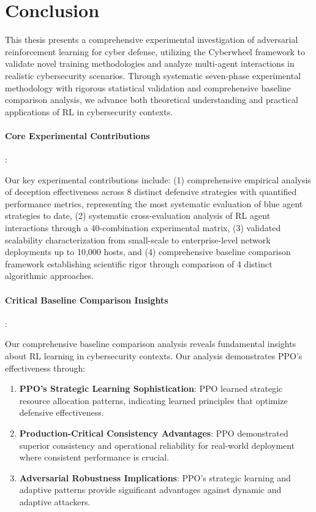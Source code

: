\documentclass[12pt,oneside]{article}
\begin{document}
\clearpage
\section{Conclusion}

This thesis presents a comprehensive experimental investigation of adversarial reinforcement learning for cyber defense, utilizing the Cyberwheel framework to validate novel training methodologies and analyze multi-agent interactions in realistic cybersecurity scenarios. Through systematic seven-phase experimental methodology with rigorous statistical validation and comprehensive baseline comparison analysis, we advance both theoretical understanding and practical applications of RL in cybersecurity contexts.

\paragraph{Core Experimental Contributions}:

Our key experimental contributions include: (1) comprehensive empirical analysis of deception effectiveness across 8 distinct defensive strategies with quantified performance metrics, representing the most systematic evaluation of blue agent strategies to date, (2) systematic cross-evaluation analysis of RL agent interactions through a 40-combination experimental matrix, (3) validated scalability characterization from small-scale to enterprise-level network deployments up to 10,000 hosts, and (4) comprehensive baseline comparison framework establishing scientific rigor through comparison of 4 distinct algorithmic approaches.

\paragraph{Critical Baseline Comparison Insights}:

Our comprehensive baseline comparison analysis reveals fundamental insights about RL learning in cybersecurity contexts. Our analysis demonstrates PPO's effectiveness through:

\begin{enumerate}
\item \textbf{PPO's Strategic Learning Sophistication}: PPO learned strategic resource allocation patterns, indicating learned principles that optimize defensive effectiveness.

\item \textbf{Production-Critical Consistency Advantages}: PPO demonstrated superior consistency and operational reliability for real-world deployment where consistent performance is crucial.

\item \textbf{Adversarial Robustness Implications}: PPO's strategic learning and adaptive patterns provide significant advantages against dynamic and adaptive attackers.
\end{enumerate}
\end{document}
